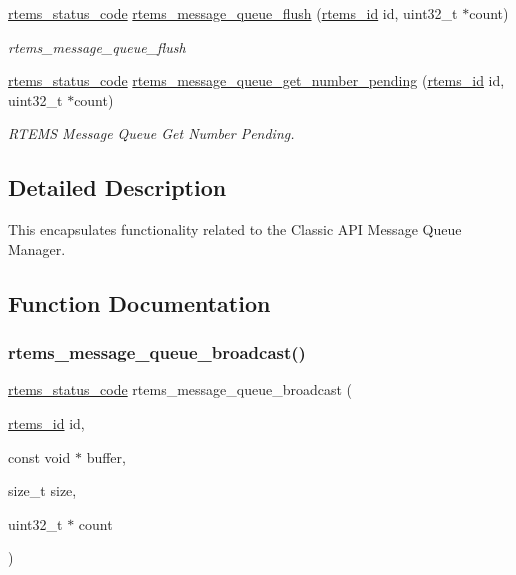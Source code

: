 \begin{DoxyCompactItemize}
\mbox{\hyperlink{group__ClassicStatus_ga545d41846817eaba6143d52ee4d9e9fe}{rtems\+\_\+status\+\_\+code}} \mbox{\hyperlink{group__ClassicMessageQueue_ga8b97ede3b5602d6f5cca6229f96f27ee}{rtems\+\_\+message\+\_\+queue\+\_\+flush}} (\mbox{\hyperlink{group__ClassicTasks_gab20892b814dced7dd4e5b9bf42becd57}{rtems\+\_\+id}} id, uint32\+\_\+t $\ast$count)
\begin{DoxyCompactList}\small\item\em rtems\+\_\+message\+\_\+queue\+\_\+flush \end{DoxyCompactList}\item 
\mbox{\hyperlink{group__ClassicStatus_ga545d41846817eaba6143d52ee4d9e9fe}{rtems\+\_\+status\+\_\+code}} \mbox{\hyperlink{group__ClassicMessageQueue_gacee875342933dcff59f9ed66232cdce8}{rtems\+\_\+message\+\_\+queue\+\_\+get\+\_\+number\+\_\+pending}} (\mbox{\hyperlink{group__ClassicTasks_gab20892b814dced7dd4e5b9bf42becd57}{rtems\+\_\+id}} id, uint32\+\_\+t $\ast$count)
\begin{DoxyCompactList}\small\item\em R\+T\+E\+MS Message Queue Get Number Pending. \end{DoxyCompactList}\end{DoxyCompactItemize}


\subsection{Detailed Description}
This encapsulates functionality related to the Classic A\+PI Message Queue Manager. 

\subsection{Function Documentation}
\mbox{\label{group__ClassicMessageQueue_ga5759faf0197e089163a1005f343d8713}} 
\subsubsection{\texorpdfstring{rtems\_message\_queue\_broadcast()}{rtems\_message\_queue\_broadcast()}}
{\footnotesize\ttfamily \mbox{\hyperlink{group__ClassicStatus_ga545d41846817eaba6143d52ee4d9e9fe}{rtems\+\_\+status\+\_\+code}} rtems\+\_\+message\+\_\+queue\+\_\+broadcast (\begin{DoxyParamCaption}\item[{\mbox{\hyperlink{group__ClassicTasks_gab20892b814dced7dd4e5b9bf42becd57}{rtems\+\_\+id}}}]{id,  }\item[{const void $\ast$}]{buffer,  }\item[{size\+\_\+t}]{size,  }\item[{uint32\+\_\+t $\ast$}]{count }\end{DoxyParamCaption})}



